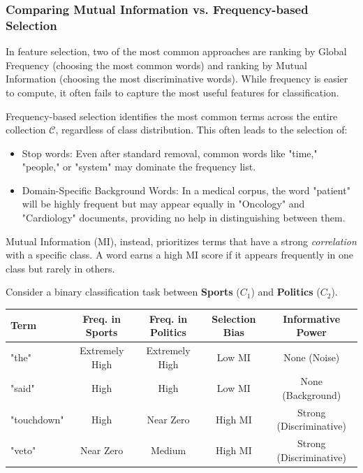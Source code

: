 \subsubsection*{Comparing Mutual Information vs. Frequency-based Selection}

In feature selection, two of the most common approaches are ranking by \alert{Global Frequency} (choosing the most common words) and ranking by \alert{Mutual Information} (choosing the most discriminative words). While frequency is easier to compute, it often fails to capture the most useful features for classification.

\medskip
Frequency-based selection identifies the most common terms across the entire collection $\mathcal{C}$, regardless of class distribution. This often leads to the selection of:
\begin{itemize}
    \item Stop words: Even after standard removal, common words like "time," "people," or "system" may dominate the frequency list.
    \item Domain-Specific Background Words: In a medical corpus, the word "patient" will be highly frequent but may appear equally in "Oncology" and "Cardiology" documents, providing no help in distinguishing between them.
\end{itemize}




Mutual Information (MI), instead, prioritizes terms that have a strong \textit{correlation} with a specific class. A word earns a high MI score if it appears frequently in one class but rarely in others.

\begin{myexample}
Consider a binary classification task between \textbf{Sports} ($C_1$) and \textbf{Politics} ($C_2$).

\begin{center}
\begin{tabular}{|l|c|c|c|c|}
\hline
\textbf{Term} & \textbf{Freq. in Sports} & \textbf{Freq. in Politics} & \textbf{Selection Bias} & \textbf{Informative Power} \\
\hline
"the" & Extremely High & Extremely High & Low MI & None (Noise) \\
"said" & High & High & Low MI & None (Background) \\
"touchdown" & High & Near Zero & \alert{High MI} & Strong (Discriminative) \\
"veto" & Near Zero & Medium & \alert{High MI} & Strong (Discriminative) \\
\hline
\end{tabular}
\end{center}
\end{myexample}


